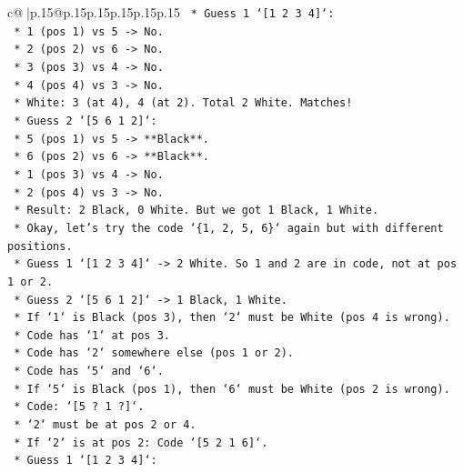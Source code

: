 \documentclass{article}
\begin{document}
{\begin{supertabular}{c@{$\;$}|p{.15\linewidth}@{}p{.15\linewidth}p{.15\linewidth}p{.15\linewidth}p{.15\linewidth}p{.15\linewidth}}
{{{\texttt{                *   Guess 1 `{[}1 2 3 4{]}`:} \\
\texttt{                    *   1 (pos 1) vs 5 {-}> No.} \\
\texttt{                    *   2 (pos 2) vs 6 {-}> No.} \\
\texttt{                    *   3 (pos 3) vs 4 {-}> No.} \\
\texttt{                    *   4 (pos 4) vs 3 {-}> No.} \\
\texttt{                    *   White: 3 (at 4), 4 (at 2). Total 2 White. Matches!} \\
\texttt{                *   Guess 2 `{[}5 6 1 2{]}`:} \\
\texttt{                    *   5 (pos 1) vs 5 {-}> **Black**.} \\
\texttt{                    *   6 (pos 2) vs 6 {-}> **Black**.} \\
\texttt{                    *   1 (pos 3) vs 4 {-}> No.} \\
\texttt{                    *   2 (pos 4) vs 3 {-}> No.} \\
\texttt{                    *   Result: 2 Black, 0 White. But we got 1 Black, 1 White.} \\
\texttt{    *   Okay, let's try the code `\{1, 2, 5, 6\}` again but with different positions.} \\
\texttt{        *   Guess 1 `{[}1 2 3 4{]}` {-}> 2 White. So 1 and 2 are in code, not at pos 1 or 2.} \\
\texttt{        *   Guess 2 `{[}5 6 1 2{]}` {-}> 1 Black, 1 White.} \\
\texttt{        *   If `1` is Black (pos 3), then `2` must be White (pos 4 is wrong).} \\
\texttt{            *   Code has `1` at pos 3.} \\
\texttt{            *   Code has `2` somewhere else (pos 1 or 2).} \\
\texttt{            *   Code has `5` and `6`.} \\
\texttt{            *   If `5` is Black (pos 1), then `6` must be White (pos 2 is wrong).} \\
\texttt{                *   Code: `{[}5 ? 1 ?{]}`.} \\
\texttt{                *   `2` must be at pos 2 or 4.} \\
\texttt{                *   If `2` is at pos 2: Code `{[}5 2 1 6{]}`.} \\
\texttt{                    *   Guess 1 `{[}1 2 3 4{]}`:} \\
}}}
\end{supertabular}}
\end{document}
